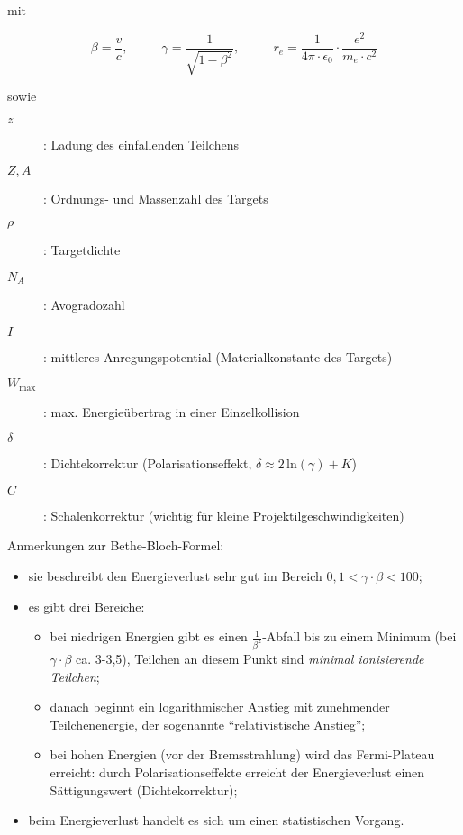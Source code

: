mit 

\[\beta =
\frac{v}{c},~~~~~~~~~~~~\gamma=\frac{1}{\sqrt{1-\beta^2}},~~~~~~~~~~~~
r_e=\frac{1}{4\pi\cdot\epsilon_0}\cdot\frac{e^2}{m_e\cdot c^2}\]

sowie
\begin{description}
\item[$z$]: Ladung des einfallenden Teilchens
\item[$Z, A$]: Ordnungs- und Massenzahl des Targets
\item[$\rho$]: Targetdichte
\item[$N_A$]: Avogradozahl
\item[$I$]: mittleres Anregungspotential (Materialkonstante des Targets)
\item[$W_{\text{max}}$]: max. Energieübertrag in einer Einzelkollision
\item[$\delta$]: Dichtekorrektur (Polarisationseffekt, $\delta \approx 2\,\text{ln}(\gamma)+K$)
\item[$C$]: Schalenkorrektur (wichtig für kleine Projektilgeschwindigkeiten)
\end{description}


Anmerkungen zur Bethe-Bloch-Formel:
\begin{itemize}
  \item sie beschreibt den Energieverlust sehr gut im Bereich $0{,}1 < \gamma\cdot\beta < 100$;
  \item es gibt drei Bereiche:
  			\begin{itemize}
  			  \item bei niedrigen Energien gibt es einen $\frac{1}{\beta^2}$-Abfall bis zu einem Minimum
  			  (bei $\gamma\cdot\beta$ ca. 3-3,5), Teilchen an diesem Punkt sind \textit{minimal ionisierende Teilchen};
  			  \item danach beginnt ein logarithmischer Anstieg mit zunehmender Teilchenenergie, der
  			  sogenannte "`relativistische Anstieg"';
  			  \item bei hohen Energien (vor der Bremsstrahlung) wird das Fermi-Plateau erreicht: durch
  			  Polarisationseffekte erreicht der Energieverlust  einen Sättigungswert (Dichtekorrektur);
  			  \end{itemize}
  \item beim Energieverlust handelt es sich um einen statistischen Vorgang.
\end{itemize}

